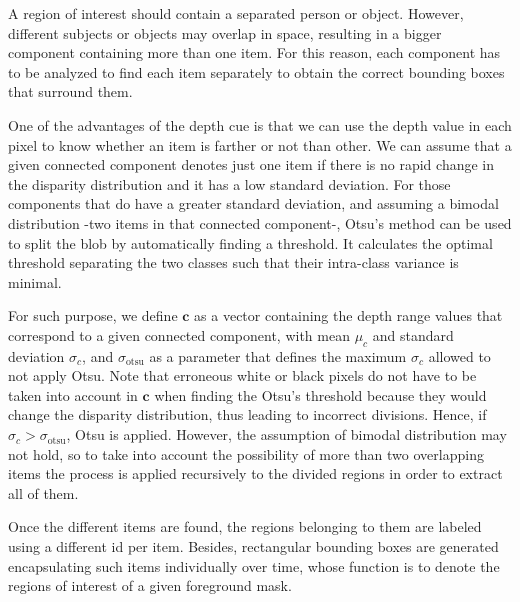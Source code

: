 \documentclass[10pt,twocolumn,letterpaper]{article}
\begin{document}
A region of interest should contain a separated person or object. However, different subjects or objects may overlap in space, resulting in a bigger component containing more than one item. For this reason, each component has to be analyzed to find each item separately to obtain the correct bounding boxes that surround them.

One of the advantages of the depth cue is that we can use the depth value in each pixel to know whether an item is farther or not than other. We can assume that a given connected component denotes just one item if there is no rapid change in the disparity distribution and it has a low standard deviation. For those components that do have a greater standard deviation, and assuming a bimodal distribution -two items in that connected component-, Otsu's method \cite{otsu1975threshold} can be used to split the blob by automatically finding a threshold. It calculates the optimal threshold separating the two classes such that their intra-class variance is minimal. 


For such purpose, we define $\mathbf{c}$ as a vector containing the depth range values that correspond to a given connected component, with mean $\mu_{c}$ and standard deviation $\sigma_{c}$, and $\sigma_\mathrm{otsu}$ as a parameter that defines the maximum $\sigma_{c}$ allowed to not apply Otsu. Note that erroneous white or black pixels do not have to be taken into account in $\mathbf{c}$ when finding the Otsu's threshold because they would change the disparity distribution, thus leading to incorrect divisions. Hence, if $\sigma_{c} > \sigma_\mathrm{otsu}$, Otsu is applied. However, the assumption of bimodal distribution may not hold, so to take into account the possibility of more than two overlapping items the process is applied recursively to the divided regions in order to extract all of them. 

Once the different items are found, the regions belonging to them are labeled using a different id per item. Besides, rectangular bounding boxes are generated encapsulating such items individually over time, whose function is to denote the regions of interest of a given foreground mask. 

\end{document}
